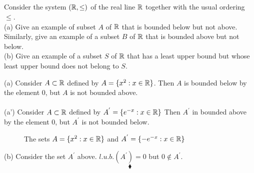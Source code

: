 \subsection{}
\begin{tcolorbox}
Consider the system $(\mathbb{R}, \leq )$ of the real line $\mathbb{R}$ together with the usual ordering $\leq $.\\
 (a) Give an example of subset $A$ of $\mathbb{R}$  that is bounded below but not above. Similarly, give an example of a subset $B$ of $\mathbb{R}$ that is bounded above but not below.\\
(b) Give an example of a subset $S$ of $\mathbb{R}$ that has a least upper bound but whose least upper bound does not belong to $S$. 
\end{tcolorbox}
$$ $$
(a) Consider $A\subset \mathbb{R}$ defined by $A=\{x^2:x\in \mathbb{R}\}$.
Then $A$ is bounded below by the element $0$, but $A$ is not bounded above. \\\\

(a') Consider $A\subset \mathbb{R}$ defined by $A^{'}=\{e^{-x}:x\in \mathbb{R}\}$
Then $A^{'}$ in bounded above by the element $0$, but $A^{'}$ is not bounded below. 
\begin{figure}[H]%
    \centering
    
\caption{The sets  $A=\{x^2:x\in \mathbb{R}\}$ and $A^{'}=\{-e^{-x}:x\in \mathbb{R}\}$}
\label{fig:fig_p8b}
\end{figure}
(b) Consider the set $A^{'}$ above. $l.u.b.(A^{'}) = 0$ but $0\not\in A^{'}$.
$$\blacklozenge$$

